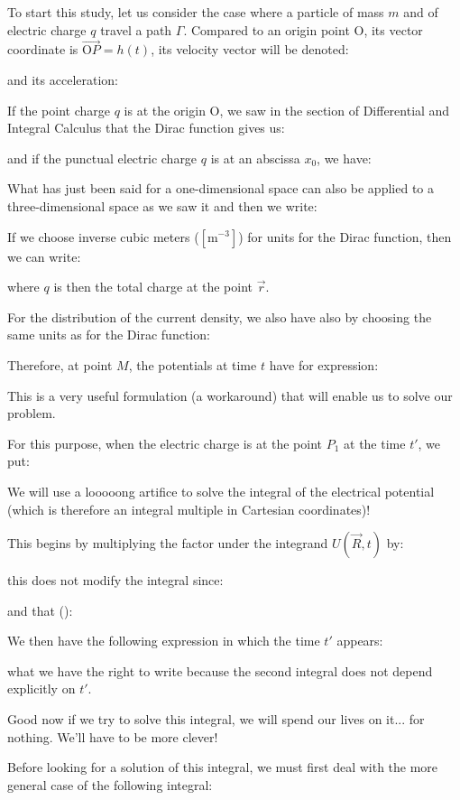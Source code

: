 	To start this study, let us consider the case where a particle of mass $m$ and of electric charge $q$ travel a path $\Gamma$. Compared to an origin point O, its vector coordinate is $\overrightarrow{\text{O}P}=h(t)$, its velocity vector will be denoted:
	
	and its acceleration:
	
	If the point charge $q$ is at the origin O, we saw in the section of Differential and Integral Calculus that the Dirac function gives us:
	
	and if the punctual electric charge $q$ is at an abscissa $x_0$, we have:
	
	What has just been said for a one-dimensional space can also be applied to a three-dimensional space as we saw it and then we write:
	
	If we choose inverse cubic meters ($[\text{m}^{-3}]$) for units for the Dirac function, then we can write:
	
	where $q$ is then the total charge at the point $\vec{r}$.

	For the distribution of the current density, we also have also by choosing the same units as for the Dirac function:
	
	Therefore, at point $M$, the potentials at time $t$ have for expression:
	
	This is a very useful formulation (a workaround) that will enable us to solve our problem.

	For this purpose, when the electric charge is at the point $P_1$ at the time $t'$, we put:
	
	We will use a looooong artifice to solve the integral of the electrical potential (which is therefore an integral multiple in Cartesian coordinates)!

	This begins by multiplying the factor under the integrand $U(\vec{R},t)$ by:
	
	this does not modify the integral since:
	
	and that ():
	
	We then have the following expression in which the time $t'$ appears:
	
	what we have the right to write because the second integral does not depend explicitly on $t'$.
	
	Good now if we try to solve this integral, we will spend our lives on it... for nothing. We'll have to be more clever!

	Before looking for a solution of this integral, we must first deal with the more general case of the following integral:
	
